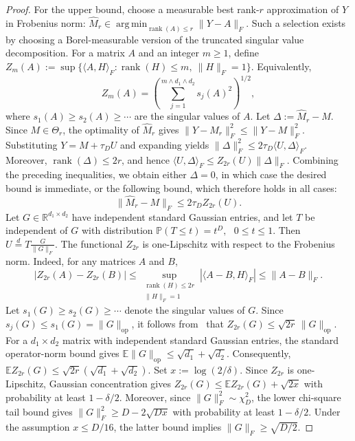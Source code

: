 \documentclass[11pt]{article}
\theoremstyle{definition}
\theoremstyle{remark}
\newcommand{\1}{\boldsymbol{1}}
\begin{document}
\begin{proof}
For the upper bound, choose a measurable best rank-\(r\) approximation
of \(Y\) in Frobenius norm:
\(
\widehat M_r
\in
\operatorname*{arg\,min}_{\operatorname{rank}(A)\le r}
\|Y-A\|_F.
\)
Such a selection exists by choosing a Borel-measurable version of the
truncated singular value decomposition. For a matrix \(A\) and an integer
\(m\ge1\), define \(Z_m(A):=\sup\{\langle A,H\rangle_F:
\operatorname{rank}(H)\le m,\ \|H\|_F=1\}\).
Equivalently,
\begin{equation}
Z_m(A)
=
\left(
    \sum_{j=1}^{m\wedge d_1\wedge d_2}
    s_j(A)^2
\right)^{1/2},\label{eq:zmVariational}
\end{equation}
where \(s_1(A)\ge s_2(A)\ge\cdots\) are the singular values of \(A\).
Let \(\Delta:=\widehat M_r-M\). Since \(M\in\Theta_r\), the optimality
of \(\widehat M_r\) gives
\(
\|Y-\widehat M_r\|_F^2
\le
\|Y-M\|_F^2.
\)
Substituting \(Y=M+\tau_DU\) and expanding yields
\(
\|\Delta\|_F^2
\le
2\tau_D\langle U,\Delta\rangle_F.
\)
Moreover, \(\operatorname{rank}(\Delta)\le2r\), and hence
\(\langle U,\Delta\rangle_F\le Z_{2r}(U)\|\Delta\|_F\).
Combining the preceding inequalities, we obtain either \(\Delta=0\),
in which case the desired bound is immediate, or the following bound,
which therefore holds in all cases:
\begin{equation}
\|\widehat M_r-M\|_F
\le
2\tau_D Z_{2r}(U).
\label{eq:lowRankProjectionBasicInequality}
\end{equation}
Let \(G\in\mathbb R^{d_1\times d_2}\) have independent standard Gaussian
entries, and let \(T\) be independent of \(G\) with distribution
\(
\mathbb P(T\le t)=t^D,
\text{ } 0\le t\le1.
\)
Then
\(
U\stackrel{d}{=}T\frac{G}{\|G\|_F}.
\) The functional \(Z_{2r}\) is one-Lipschitz with respect to the Frobenius
norm. Indeed, for any matrices \(A\) and \(B\),
\[
|Z_{2r}(A)-Z_{2r}(B)|
\le
\sup_{\substack{\operatorname{rank}(H)\le2r\\
                 \|H\|_F=1}}
|\langle A-B,H\rangle_F|
\le
\|A-B\|_F.
\]
Let \(s_1(G)\ge s_2(G)\ge\cdots\) denote the singular values of \(G\). 
Since \(s_j(G)\le s_1(G)=\|G\|_{\mathrm{op}}\), it follows from~ that
\(Z_{2r}(G)\le\sqrt{2r}\,\|G\|_{\mathrm{op}}\).
For a \(d_1\times d_2\) matrix with independent standard Gaussian
entries, the standard operator-norm bound \cite[Proposition~10.1]{HalkoMartinssonTropp2011} gives
\(\mathbb E\|G\|_{\mathrm{op}}\le\sqrt{d_1}+\sqrt{d_2}\).
Consequently, \(\mathbb E Z_{2r}(G)\le
\sqrt{2r}(\sqrt{d_1}+\sqrt{d_2})\). Set
\(
x:=\log(2/\delta).
\)
Since \(Z_{2r}\) is one-Lipschitz, Gaussian concentration
\cite[Proposition~10.3]{HalkoMartinssonTropp2011} gives
\(Z_{2r}(G)\le\mathbb E Z_{2r}(G)+\sqrt{2x}\)
with probability at least \(1-\delta/2\). Moreover, since
\(\|G\|_F^2\sim\chi_D^2\), the lower chi-square tail bound
\cite[Lemma~1]{LaurentMassart2000} gives
\(
\|G\|_F^2
\ge
D-2\sqrt{Dx}
\)
with probability at least \(1-\delta/2\). Under the assumption
\(x\le D/16\), the latter bound implies
\(
\|G\|_F\ge\sqrt{D/2}.
\)


\end{proof}
\end{document}
